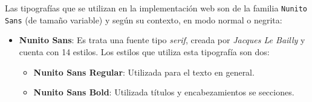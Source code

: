 \documentclass[../ei103948-project-documentation.tex]{subfiles}
\begin{document}
                                Las tipografías que se utilizan en la implementación web son de la familia \texttt{Nunito Sans} (de tamaño variable) y según su contexto, en modo normal o negrita:
                                \newpage
                                    \begin{itemize}
                                        \item \textbf{Nunito Sans}: Es trata una fuente tipo \textit{serif}, creada por \textit{Jacques Le Bailly} y cuenta con 14 estilos. Los estilos que utiliza esta tipografía son dos:
                                            \begin{itemize}
                                                \item \textbf{Nunito Sans Regular}: Utilizada para el texto en general.
                                                \begin{figure}[H]
                                                    \begin{center}
                                                    \end{center}
                                                \end{figure}
                        
                                                \item \textbf{Nunito Sans Bold}: Utilizada títulos y encabezamientos se secciones.
                                                \begin{figure}[H]
                                                    \begin{center}
                                                    \end{center}
                                                \end{figure}
                                            \end{itemize}
                                        \end{itemize}
\end{document}
